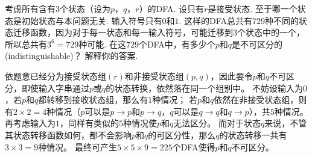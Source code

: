 \documentclass[logo,reportComp]{thesis}
\begin{document}
\begin{question}
考虑所有含有$3$个状态（设为$p$，$q$，$r$）的DFA.
设只有$r$是接受状态. 至于哪一个状态是初始状态与本问题无关.
输入符号只有$0$和$1$. 这样的DFA总共有$729$种不同的状态迁移函数，因为对于每一状态和每一输入符号，可能迁移到$3$个状态中的一个，所以总共有$3^6=729$种可能.
在这$729$个DFA中，有多少个$p$和$q$是不可区分的(indistinguishable)？
解释你的答案.
\end{question}
\begin{answer}
依题意已经分为接受状态组$(r)$和非接受状态组$(p,q)$，因此要令$p$和$q$不可区分，即使输入字串通过$p$或$q$的状态转换，依然落在同一个组别中。
不妨设输入为$0$，若$p$和$q$都转移到接收状态组，那么有$1$种情况；
若$p$和$q$依然在非接受状态组，则有$2\times 2=4$种情况（$p$可以是$p\to p$和$p\to q$，$q$可以是$q\to q$和$q\to p$），共$5$种情况。
再考虑输入为$1$，同样有类似的$5$种情况使$p$和$q$无法区分。
而对于状态$q$来说，不管其状态转移函数如何，都不会影响$p$和$q$的可区分性，那么$q$的状态转移一共有$3\times 3=9$种情况。
最终可产生$5\times 5\times 9=225$个DFA使得$p$和$q$不可区分。
\end{answer}
\end{document}
